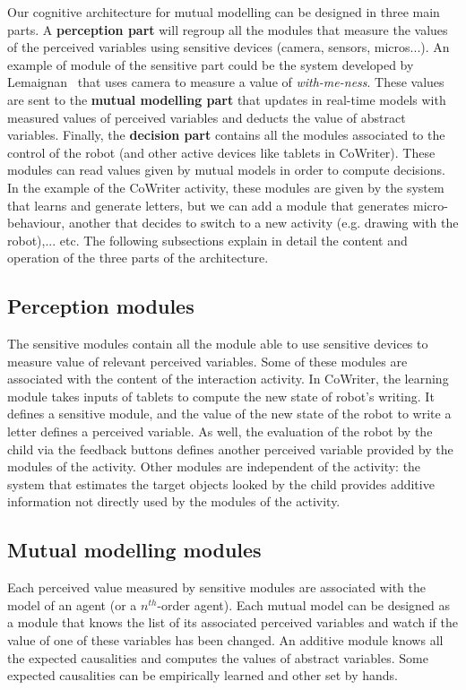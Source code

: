 \documentclass[10pt,a4paper]{article}
\begin{document}
Our cognitive architecture for mutual modelling can be designed in three main parts. A \textbf{perception part} will regroup all the modules that measure the values of the perceived variables using sensitive devices (camera, sensors, micros...). An example of module of the sensitive part could be the system developed by Lemaignan~\cite{lemaignan2016realtime} that uses camera to measure a value of \textit{with-me-ness}. These values are sent to the \textbf{mutual modelling part} that updates in real-time models with measured values of perceived variables and deducts the value of abstract variables. Finally, the \textbf{decision part} contains all the modules associated to the control of the robot (and other active devices like tablets in CoWriter). These modules can read values given by mutual models in order to compute decisions. In the example of the CoWriter activity, these modules are given by the system that learns and generate letters, but we can add a module that generates micro-behaviour, another that decides to switch to a new activity (e.g. drawing with the robot),... etc. The following subsections explain in detail the content and operation of the three parts of the architecture. 

\subsection{Perception modules}

The sensitive modules contain all the module able to use sensitive devices to measure value of relevant perceived variables. Some of these modules are associated with the content of the interaction activity. In CoWriter, the learning module takes inputs of tablets to compute the new state of robot's writing. It defines a sensitive module, and the value of the new state of the robot to write a letter defines a perceived variable. As well, the evaluation of the robot by the child via the feedback buttons defines another perceived variable provided by the modules of the activity. Other modules are independent of the activity: the system that estimates the target objects looked by the child provides additive information not directly used by the modules of the activity.  

\subsection{Mutual modelling modules}

Each perceived value measured by sensitive modules are associated with the model of an agent (or a $n^{th}$-order agent). Each mutual model can be designed as a module that knows the list of its associated perceived variables and watch if the value of one of these variables has been changed. An additive module knows all the expected causalities and computes the values of abstract variables. Some expected causalities can be empirically learned and other set by hands. 
\end{document}
